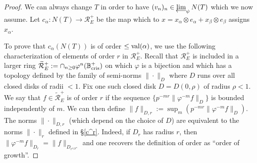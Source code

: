 \documentclass[11pt]{amsart}
\def\limproj{\mathop{\oalign{{\rm lim}\cr 
\hidewidth$\longleftarrow$\hidewidth\cr}}}
\def\bcris{\mathbb{B}_{\rm cris}}
\begin{document}
\begin{proof} 
We can always change $T$ in order to have $(v_n)_n \in 
\limproj_{\psi}N(T)$ which we now assume. 
Let $c_\alpha : N(T) \rightarrow {\mathcal R}_E^+$ be the map which to 
$x=x_{\alpha} \otimes e_{\alpha} + x_{\beta} \otimes e_{\beta}$ 
assigns $x_\alpha$. 

To prove that $c_\alpha(N(T))$ is of order  
$\leq {\rm val}(\alpha)$, we use the 
following characterization of elements of order $r$ in 
${\mathcal R}_E^+$. Recall that ${\mathcal R}_E^+$ is included in a 
larger ring $\widetilde{\mathcal{R}}_E^+:=\cap_{n\geq
  0}\varphi^n(\bcris^+)$ 
on which $\varphi$ is a bijection 
and which has a topology defined by the family of semi-norms 
$\|\cdot\|_D$ where $D$ runs over all closed disks of radii $<1$. 
Fix one such closed disk $D=D(0,\rho)$ of radius $\rho < 1$.  
We say that $f \in \widetilde{\mathcal{R}}_E^+$ is of order $r$ if  
the sequence $\{ p^{-mr} \| \varphi^{-m} f \|_D \}$ is bounded 
independently of $m$. We can then define $\|f\|_{D,r}:=\sup_m(p^{-mr}  
\| \varphi^{-m} f \|_D)$. The norms $\|\cdot\|_{D,r}$ (which depend 
on the choice of $D$) are equivalent to the norms $\|\cdot\|_r$  
defined in \S\ref{c^r}. Indeed, if $D_r$ has radius $r$, then
$\| \varphi^{-m} f \|_{D_r} = \| f \|_{D_{r^{1/p^m}}}$  and one
recovers the definition of order as ``order of growth''.


\end{proof}
\end{document}
